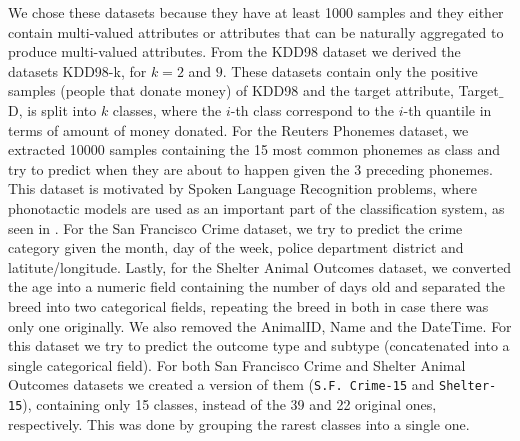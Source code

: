 We chose  these datasets  because they
have at least 1000 samples and they  either contain  multi-valued attributes 
or attributes that can be naturally aggregated to produce multi-valued attributes. 
From the KDD98 dataset we derived the datasets
KDD98-k, for $k = 2$ and $9$. These datasets contain
only the positive samples (people that donate money) 
of KDD98 and the target attribute, Target$\_$D, is split into $k$ classes, where the $i$-th
class correspond to the $i$-th quantile in terms of amount of money donated. For the Reuters Phonemes dataset,
we extracted 10000 samples containing the 15 most common phonemes as class and try to predict when they are about to happen given the 3 preceding phonemes.
This dataset is motivated by Spoken Language Recognition problems, where phonotactic models are used as an important part of the classification system, as seen in \cite{conf/interspeech/Navratil06}. 
For the San Francisco Crime dataset, we try to predict the crime category given the month, day of the week, police department district and latitute/longitude. Lastly, for the Shelter Animal Outcomes dataset, we converted the age into a numeric field containing the
number of days old and separated the breed into two categorical fields, repeating the breed in both in case there was only one originally. We also removed the AnimalID, Name and the DateTime. For this dataset we try to predict the outcome type and subtype (concatenated into a single categorical field). For both 
San Francisco Crime and  Shelter Animal Outcomes
 datasets we created a version of them ({\tt S.F. Crime-15} and {\tt Shelter-15}), containing only 15 classes, instead of the 39 and 22 original ones, respectively. This was done by grouping the rarest classes into a single one. 

